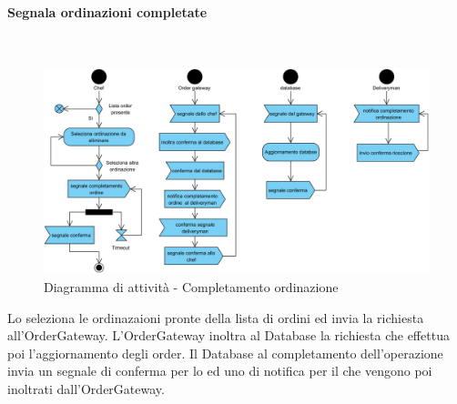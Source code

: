 \begin{samepage}
	\paragraph{Segnala ordinazioni completate}\mbox{}\\
	\begin{figure}[H]
		\centering
		\includegraphics[width=14cm]{diagrammi_img/attivita/chef_comlete_order.png}
		\caption{Diagramma di attività - Completamento ordinazione}
	\end{figure}
\end{samepage}
Lo \Chef{} seleziona le ordinazaioni pronte della lista di ordini ed invia la richiesta all'Order\-Gateway. L'Order\-Gateway inoltra al Database la richiesta che effettua poi l'aggiornamento degli order. Il Database al completamento dell'operazione invia un segnale di conferma per lo \Chef{} ed uno di notifica per il \Deliveryman{} che vengono poi inoltrati dall'Order\-Gateway.

\subsubsection{\Deliveryman{}}

